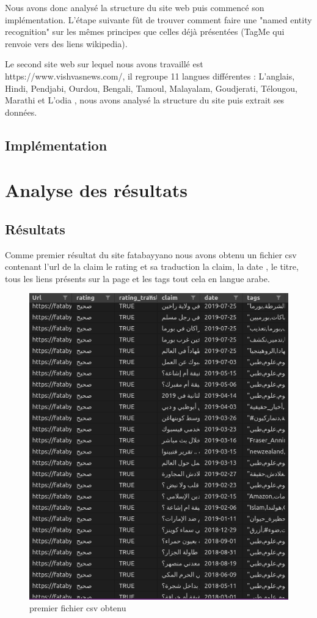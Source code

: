 \documentclass[oneside,13pt,a4paper]{report}
\begin{document}
Nous avons donc analysé la structure du site web puis commencé son implémentation. L'étape suivante fût de trouver comment faire une "named entity recognition" sur les mêmes principes que celles déjà présentées (TagMe qui renvoie vers des liens wikipedia).

Le second site web sur lequel nous avons travaillé est https://www.vishvasnews.com/, il regroupe 11 langues différentes : L'anglais, Hindi, Pendjabi, Ourdou, Bengali, Tamoul, Malayalam, Goudjerati, Télougou, Marathi et L'odia , nous avons analysé la structure du site puis extrait ses données.

\section{Implémentation}

\chapter{Analyse des résultats}

\section{Résultats}
Comme premier résultat du site fatabayyano nous avons obtenu un fichier csv contenant l'url de la claim le rating et sa traduction la claim, la date , le titre, tous les liens présents sur la page et les tags tout cela en langue arabe.
\begin{figure}[h]
	\centering
	\begin{minipage}[c]{.5\linewidth}
\includegraphics[width=1\textwidth]{img/fatab1.png}
\caption{premier fichier csv obtenu}
	\end{minipage}
\end{figure}
\end{document}
